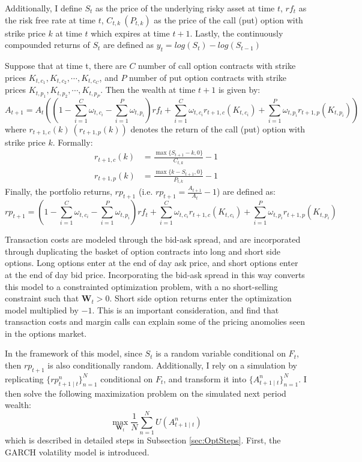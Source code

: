 Additionally, I define $S_{t}$ as the price of the underlying risky asset at time $t$, $rf_{t}$ as the risk free rate at time $t$, $C_{t, k} \ (P_{t, k})$ as the price of the call (put) option with strike price $k$ at time $t$ which expires at time $t + 1$. Lastly, the continuously compounded returns of $S_{t}$ are defined as $y_{t} = log(S_{t}) - log(S_{t - 1})$

Suppose that at time t, there are $C$ number of call option contracts with strike prices $K_{t, c_{1}}, K_{t, c_{2}}, \dotsb, K_{t, c_{C}}$, and $P$ number of put option contracts with strike prices $K_{t, p_{1}}, K_{t, p_{2}}, \dotsb, K_{t, p_{P}}$. Then the wealth at time $t + 1$ is given by:
\noindent
\[A_{t+1} = A_{t}((1 - \sum_{i = 1}^{C} \omega_{t, c_{i}} - \sum_{i = 1}^{P} \omega_{t, p_{i}}) rf_{t} + \sum_{i = 1}^{C} \omega_{t, c_{i}} r_{t + 1, c} (K_{t, c_{i}}) + \sum_{i = 1}^{P} \omega_{t, p_{i}} r_{t + 1, p}(K_{t, p_{i}}))\]
\noindent
where $r_{t + 1, c}(k) \ (r_{t + 1, p}(k))$ denotes the return of the call (put) option with strike price $k$. Formally:
\noindent
\begin{align}
\nonumber r_{t+1, c}(k) & = \frac{\max \{S_{t + 1} - k, 0\}}{C_{t, k}} - 1
\\ \nonumber r_{t+1, p}(k) &= \frac{\max \{k - S_{t + 1}, 0\}}{P_{t, k}} - 1
\end{align}
\noindent
Finally, the portfolio returns, $rp_{t + 1}$ (i.e. $rp_{t + 1} = \frac{A_{t + 1}}{A_{t}} - 1$) are defined as:
\noindent
\[r p_{t+1} = (1 - \sum_{i = 1}^{C} \omega_{t, c_{i}} - \sum_{i = 1}^{P} \omega_{t, p_{i}}) rf_{t} + \sum_{i = 1}^{C} \omega_{t, c_{i}} r_{t+1, c}(K_{t, c_{i}})+ \sum_{i=1}^{P} \omega_{t, p_{i}} r_{t+1, p}(K_{t, p_{i}})\]

Transaction costs are modeled through the bid-ask spread, and are incorporated through duplicating the basket of option contracts into long and short side options. Long options enter at the end of day ask price, and short options enter at the end of day bid price. Incorporating the bid-ask spread in this way converts this model to a constrainted optimization problem, with a no short-selling constraint such that $\mathbf{W}_{t} > 0$. Short side option returns enter the optimization model multiplied by $-1$. This is an important consideration, and \cite{santa2009option} find that transaction costs and margin calls can explain some of the pricing anomolies seen in the options market.

In the framework of this model, since $S_{t}$ is a random variable conditional on $F_{t}$, then $rp_{t + 1}$ is also conditionally random. Additionally, I rely on a simulation by replicating $\{rp_{t+1 \mid t}^{n}\}_{n=1}^{N}$ conditional on $F_{t}$, and transform it into $\{A_{t+1 \mid t}^{n}\}_{n=1}^{N}$. I then solve the following maximization problem on the simulated next period wealth:
\noindent
\[\max_{\mathbf{W}_{t}} \frac{1}{N} \sum_{n=1}^{N} U(A_{t+1 \mid t}^{n})\]
\noindent
which is described in detailed steps in Subsection \ref{sec:OptSteps}. First, the GARCH volatility model is introduced.

